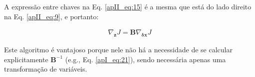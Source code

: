 A expressão entre chaves na Eq. \ref{apII_eq:15} é a mesma que está do lado direito na Eq. \ref{apII_eq:9}, e portanto:

\begin{equation}
\label{apII_eq:16}
  \begin{split}
\nabla_{\mathbf{z}}J = \mathbf{B} \nabla_{\mathbf{\delta{x}}}J
  \end{split}
\end{equation}

Este algoritmo é vantajoso porque nele não há a necessidade de se calcular explicitamente $\mathbf{B}^{-1}$ (e.g., Eq. \ref{apI_eq:21}), sendo necessária apenas uma transformação de variáveis.
